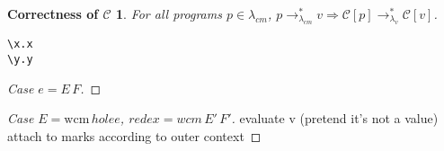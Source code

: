 \documentclass[ms,electronic,twosidetoc,letterpaper,chaptercenter,parttop]{byumsphd}
\begin{document}

\newtheorem*{maintheorem}{Correctness of $\mathcal{C}$}
\begin{maintheorem}
For all programs $p\in\lambda_{cm}$, $p\rightarrow_{\lambda_{cm}}^{*}v\Rightarrow \mathcal{C}[p]\rightarrow_{\lambda_{v}}^{*}\mathcal{C}[v]$.
\end{maintheorem}














\begin{verbatim}
\x.x
\y.y
\end{verbatim}

\begin{proof}[Case $e=E\,F$]

\end{proof}

\begin{proof}[Case $E=\mathrm{wcm}\,hole e$, $redex=wcm\,E'\,F'$]
evaluate v (pretend it's not a value)
attach to marks according to outer context

\end{proof}
\end{document}
